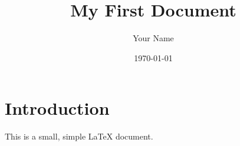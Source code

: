 \documentclass{article}
\title{My First Document}
\author{Your Name}
\date{\today}
\begin{document}
\maketitle

\section{Introduction}
This is a small, simple LaTeX document. 
\end{document}
